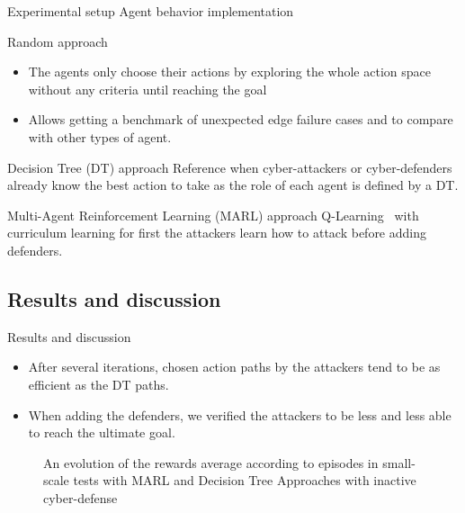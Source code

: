 	\begin{frame}{Experimental setup}
		{Agent behavior implementation}

            \begin{block}{Random approach}
                \begin{itemize}
                    \item The agents only choose their actions by exploring the whole action space without any criteria until reaching the goal
                    \item Allows getting a benchmark of unexpected edge failure cases and to compare with other types of agent.
                \end{itemize}
            \end{block}

            \begin{block}{Decision Tree (DT) approach}
                Reference when cyber-attackers or cyber-defenders already know the best action to take as the role of each agent is defined by a DT.
            \end{block}

            \begin{block}{Multi-Agent Reinforcement Learning (MARL) approach}
                Q-Learning~\cite{CWatkins1992} with curriculum learning for first the attackers learn how to attack before adding defenders.
            \end{block}
 
	\end{frame}


 	\subsection{Results and discussion}

 	\begin{frame}{Results and discussion}
		{}

        \begin{itemize}
            \item After several iterations, chosen action paths by the attackers tend to be as efficient as the DT paths.
            \item When adding the defenders, we verified the attackers to be less and less able to reach the ultimate goal.
        \end{itemize}

        \begin{figure}
            \centering
            

            \vspace{-0.2cm}
            
            \caption{An evolution of the rewards average according to episodes in small-scale tests with MARL and Decision Tree Approaches with inactive cyber-defense
            }
            \label{fig:graphs}
        \end{figure}
 
	\end{frame}
